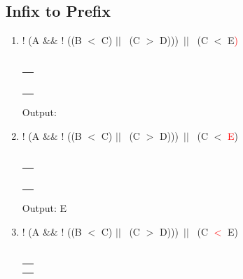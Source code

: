\documentclass[a4paper]{article}
\begin{document}
\begin{large}
  \subsection{Infix to Prefix}
  \begin{enumerate}
    \renewcommand{\arraystretch}{1.3}
    \item
          ! (A \&\& ! ((B $<$ C) $||$ \ (C $>$ D)))\ $||$ \ (C $<$ E\textcolor{red}{)} \\
          \\
          \begin{tabular}[t]{ | p{1.6em} | }
            \makecell{ } \\ \hline
            \makecell{}  \\ \hline
            \makecell{}  \\ \hline
            \makecell{}  \\ \hline
            \makecell{}  \\ \hline
            \makecell{)} \\ \hline
          \end{tabular}
          \hspace{2em}
          Output:
    \item
          ! (A \&\& ! ((B $<$ C) $||$ \ (C $>$ D)))\ $||$ \ (C $<$ \textcolor{red}{E})\\
          \\
          \begin{tabular}[t]{ | p{1.6em} | }
            \makecell{ } \\ \hline
            \makecell{}  \\ \hline
            \makecell{}  \\ \hline
            \makecell{}  \\ \hline
            \makecell{}  \\ \hline
            \makecell{)} \\ \hline
          \end{tabular}
          \hspace{2em}
          Output: E
    \item
          ! (A \&\& ! ((B $<$ C) $||$ \ (C $>$ D)))\ $||$ \ (C  \textcolor{red}{$<$} E)\\
          \\
          \begin{tabular}[t]{ | p{1.6em} | }
            \makecell{ }   \\ \hline
            \makecell{}    \\ \hline
            \makecell{}    \\ \hline

\end{tabular}
\end{enumerate}
\end{large}
\end{document}
